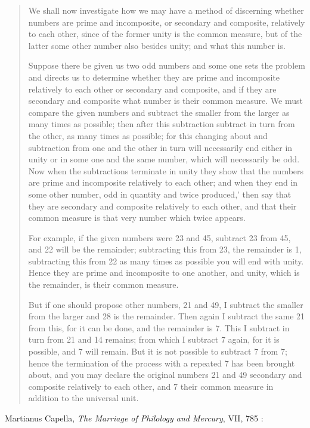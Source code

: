 \documentclass{article}
\begin{document}
\begin{quote}
We shall now investigate how we may have a method of discerning
whether numbers are prime and incomposite, or secondary
and composite, relatively to each other, since of the former unity is
the common measure, but of the latter some other number also besides
unity; and what this number is. 

Suppose there be given us two odd numbers and some one sets the
problem and directs us to determine whether they are prime and incomposite
relatively to each other or secondary and composite, and
if they are secondary and composite what number is their common
measure. We must compare the given numbers and subtract the
smaller from the larger as many times as possible; then after this subtraction
subtract in turn from the other, as many times as possible;
for this changing about and subtraction from one and the other in
turn will necessarily end either in unity or in some one and the same
number, which will necessarily be odd. Now when the subtractions
terminate in unity they show that the numbers are prime and incomposite
relatively to each other; and when they end in some other
number, odd in quantity and twice produced,' then say that they are
secondary and composite relatively to each other, and that their common
measure is that very number which twice appears. 

For example, if the given numbers were 23 and 45, subtract 23 from
45, and 22 will be the remainder; subtracting this from 23, the remainder
is 1, subtracting this from 22 as many times as possible you
will end with unity. Hence they are prime and incomposite to one
another, and unity, which is the remainder, is their common measure. 

But if one should propose other numbers, 21 and 49, I subtract the
smaller from the larger and 28 is the remainder. Then again I subtract
the same 21 from this, for it can be done, and the remainder is
7. This I subtract in turn from 21 and 14 remains; from which I
subtract 7 again, for it is possible, and 7 will remain. But it is not
possible to subtract 7 from 7; hence the termination of the process
with a repeated 7 has been brought about, and you may declare the
original numbers 21 and 49 secondary and composite relatively to
each other, and 7 their common measure in addition to the universal
unit.
\end{quote}




Martianus Capella, {\em The Marriage of Philology and Mercury}, VII, 785 \cite[p.~306]{martianusII}:
\end{document}
